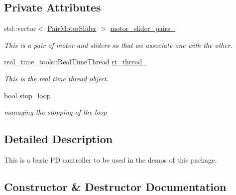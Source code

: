 \subsection*{Private Attributes}
\begin{DoxyCompactItemize}
\item 
std\+::vector$<$ \hyperlink{namespaceblmc__drivers_a134270c90d29a9a28b64ab0e5f7158f7}{Pair\+Motor\+Slider} $>$ \hyperlink{classblmc__drivers_1_1PDController_a11b0e1df638bc792b752349f39187a67}{motor\+\_\+slider\+\_\+pairs\+\_\+}\hypertarget{classblmc__drivers_1_1PDController_a11b0e1df638bc792b752349f39187a67}{}\label{classblmc__drivers_1_1PDController_a11b0e1df638bc792b752349f39187a67}

\begin{DoxyCompactList}\small\item\em This is a pair of motor and sliders so that we associate one with the other. \end{DoxyCompactList}\item 
real\+\_\+time\+\_\+tools\+::\+Real\+Time\+Thread \hyperlink{classblmc__drivers_1_1PDController_a425d7f9c093a0c586ef608d4c11c8889}{rt\+\_\+thread\+\_\+}\hypertarget{classblmc__drivers_1_1PDController_a425d7f9c093a0c586ef608d4c11c8889}{}\label{classblmc__drivers_1_1PDController_a425d7f9c093a0c586ef608d4c11c8889}

\begin{DoxyCompactList}\small\item\em This is the real time thread object. \end{DoxyCompactList}\item 
bool \hyperlink{classblmc__drivers_1_1PDController_a3520dd968bde954399bf3ef4508c3d54}{stop\+\_\+loop}\hypertarget{classblmc__drivers_1_1PDController_a3520dd968bde954399bf3ef4508c3d54}{}\label{classblmc__drivers_1_1PDController_a3520dd968bde954399bf3ef4508c3d54}

\begin{DoxyCompactList}\small\item\em managing the stopping of the loop \end{DoxyCompactList}\end{DoxyCompactItemize}


\subsection{Detailed Description}
This is a basic PD controller to be used in the demos of this package. 

\subsection{Constructor \& Destructor Documentation}

